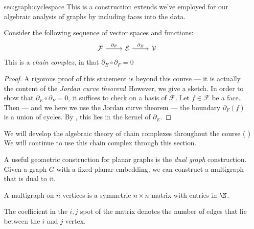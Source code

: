 \begin{stationconnection}{sec:graph:cyclespace}
This is a construction extends we've employed for our algebraic analysis of graphs  by including faces into the data.  
\begin{claim}
Consider the following sequence of vector spaces and functions:
\[ \begin{tikzcd}
\mathcal F \arrow{r}{\partial_F} & \mathcal E \arrow{r}{\partial_E} & \mathcal V
\end{tikzcd}\]
This is a \emph{chain complex}, in that $\partial_E\circ \partial_F =0$ \label{def:planarcomplex}
\label{claim:dsquarezerograph}
\end{claim}
\begin{proof}
A rigorous proof of this statement is beyond this course --- it is actually the content of the \emph{Jordan curve theorem}! However, we give a sketch. In order to show that $\partial_E\circ \partial_F=0$, it suffices to check on a basis of $\mathcal F$. Let $f\in \mathcal F$ be a face. Then --- and we here we use the Jordan curve theorem --- the boundary  $\partial_F(f)$ is a union of cycles. By , this lies in the kernel of $\partial_E$. 
\end{proof}
We will develop the algebraic theory of chain complexes throughout the course ( )
We will continue to use this chain complex through this section.
\end{stationconnection}


A useful geometric construction for planar graphs is the \emph{dual graph} construction. Given a graph $G$ with a fixed planar embedding, we can construct a multigraph that is dual to it. 
\begin{definition}[Multigraph]
 A multigraph on $n$ vertices is a symmetric $n\times n$ matrix with entries in $\N$. 
\end{definition}
The coefficient in the $i,j$ spot of the matrix denotes the number of edges that lie between the $i$ and $j$ vertex. 

